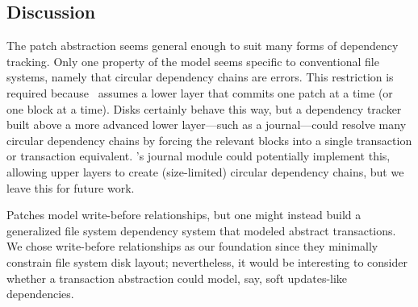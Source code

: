 


\subsection{Discussion}

The patch abstraction seems general enough to suit many forms of
 dependency tracking.
%
Only one property of the model seems specific to conventional file systems,
 namely that circular dependency chains are errors.
%
This restriction is required because \Kudos\ assumes a lower layer that
 commits one patch at a time (or one block at a time).
%
Disks certainly behave this way, but a dependency tracker built above a
 more advanced lower layer---such as a journal---could resolve many
 circular dependency chains by forcing the relevant blocks into a single
 transaction or transaction equivalent.
%
\Featherstitch's journal module could potentially implement this, allowing
 upper layers to create (size-limited) circular dependency chains, but we
 leave this for future work.

Patches model write-before relationships, but one might instead build a
 generalized file system dependency system that modeled abstract
 transactions.
%
We chose write-before relationships as our foundation since they minimally
 constrain file system disk layout; nevertheless, it would be interesting
 to consider whether a transaction abstraction could model, say, soft
 updates-like dependencies.
